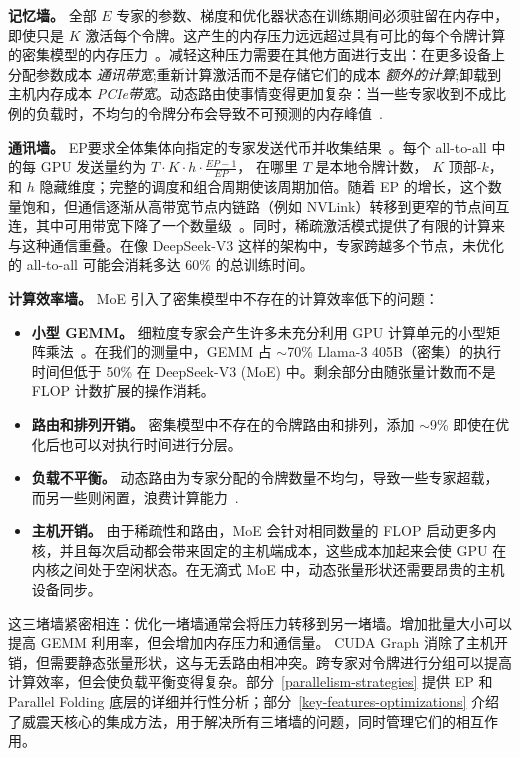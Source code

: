 \textbf{记忆墙。} 全部 $E$ 专家的参数、梯度和优化器状态在训练期间必须驻留在内存中，即使只是 $K$ 激活每个令牌。这产生的内存压力远远超过具有可比的每个令牌计算的密集模型的内存压力~\cite{fedus2022switchtransformersscalingtrillion,Cai_2025}。减轻这种压力需要在其他方面进行支出：在更多设备上分配参数成本 \emph{通讯带宽};重新计算激活而不是存储它们的成本 \emph{额外的计算};卸载到主机内存成本 \emph{PCIe带宽}。动态路由使事情变得更加复杂：当一些专家收到不成比例的负载时，不均匀的令牌分布会导致不可预测的内存峰值~\cite{lepikhin2020gshard,wang2024auxiliarylossfreeloadbalancingstrategy}.

\textbf{通讯墙。} EP要求全体集体向指定的专家发送代币并收集结果~\cite{lepikhin2020gshard}。每个 all-to-all 中的每 GPU 发送量约为 $T \cdot K \cdot h \cdot \frac{EP-1}{EP}$， 在哪里 $T$ 是本地令牌计数， $K$ 顶部-$k$， 和 $h$ 隐藏维度；完整的调度和组合周期使该周期加倍。随着 EP 的增长，这个数量饱和，但通信逐渐从高带宽节点内链路（例如 NVLink）转移到更窄的节点间互连，其中可用带宽下降了一个数量级~\cite{deepep2025}。同时，稀疏激活模式提供了有限的计算来与这种通信重叠。在像 DeepSeek-V3 这样的架构中，专家跨越多个节点，未优化的 all-to-all 可能会消耗多达 60\% 的总训练时间。

\textbf{计算效率墙。} MoE 引入了密集模型中不存在的计算效率低下的问题：
\begin{itemize}[nosep,leftmargin=*]
    \item \textbf{小型 GEMM。} 细粒度专家会产生许多未充分利用 GPU 计算单元的小型矩阵乘法~\cite{megablocks}。在我们的测量中，GEMM 占 $\sim$70\% Llama-3 405B（密集）的执行时间但低于 50\% 在 DeepSeek-V3 (MoE) 中。剩余部分由随张量计数而不是 FLOP 计数扩展的操作消耗。
    \item \textbf{路由和排列开销。} 密集模型中不存在的令牌路由和排列，添加 $\sim$9\% 即使在优化后也可以对执行时间进行分层。
    \item \textbf{负载不平衡。} 动态路由为专家分配的令牌数量不均匀，导致一些专家超载，而另一些则闲置，浪费计算能力~\cite{wang2024auxiliarylossfreeloadbalancingstrategy}.
    \item \textbf{主机开销。} 由于稀疏性和路由，MoE 会针对相同数量的 FLOP 启动更多内核，并且每次启动都会带来固定的主机端成本，这些成本加起来会使 GPU 在内核之间处于空闲状态。在无滴式 MoE 中，动态张量形状还需要昂贵的主机设备同步。
\end{itemize}

这三堵墙紧密相连：优化一堵墙通常会将压力转移到另一堵墙。增加批量大小可以提高 GEMM 利用率，但会增加内存压力和通信量。 CUDA Graph 消除了主机开销，但需要静态张量形状，这与无丢路由相冲突。跨专家对令牌进行分组可以提高计算效率，但会使负载平衡变得复杂。部分~\ref{parallelism-strategies} 提供 EP 和 Parallel Folding 底层的详细并行性分析；部分~\ref{key-features-optimizations} 介绍了威震天核心的集成方法，用于解决所有三堵墙的问题，同时管理它们的相互作用。


